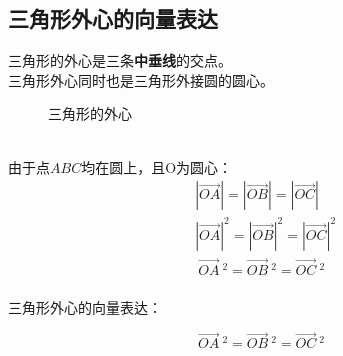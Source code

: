 \documentclass[UTF8]{ctexart}
\begin{document}
\newpage

\subsection{三角形外心的向量表达}
    三角形的外心是三条\textbf{中垂线}的交点。\\[3mm]
    三角形外心同时也是三角形外接圆的圆心。
    \vspace{-35pt}
    \begin{figure}[h]
        \begin{center}
            \hspace{30pt}
            \caption{三角形的外心}
        \end{center}
    \end{figure}\\
    由于点$ABC$均在圆上，且O为圆心：\vspace{5pt}
    \setcounter{equation}{0}
    \begin{align}
        &\left|\overrightarrow{OA}\right|=\left|\overrightarrow{OB}\right|=\left|\overrightarrow{OC}\right|\\[4mm]
        &\left|\overrightarrow{OA}\right|^2=\left|\overrightarrow{OB}\right|^2=\left|\overrightarrow{OC}\right|^2\\[4mm]
        &~\overrightarrow{OA}~^2=\overrightarrow{OB}~^2=\overrightarrow{OC}~^2
    \end{align}\\
    三角形外心的向量表达：
    \begin{large}
        \begin{equation*}
            ~\overrightarrow{OA}~^2=\overrightarrow{OB}~^2=\overrightarrow{OC}~^2
        \end{equation*}
    \end{large}
\end{document}
